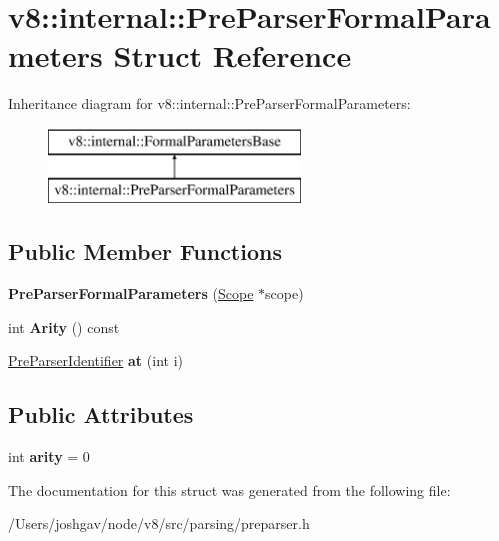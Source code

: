 \hypertarget{structv8_1_1internal_1_1_pre_parser_formal_parameters}{}\section{v8\+:\+:internal\+:\+:Pre\+Parser\+Formal\+Parameters Struct Reference}
\label{structv8_1_1internal_1_1_pre_parser_formal_parameters}
Inheritance diagram for v8\+:\+:internal\+:\+:Pre\+Parser\+Formal\+Parameters\+:\begin{figure}[H]
\begin{center}
\leavevmode
\includegraphics[height=2.000000cm]{structv8_1_1internal_1_1_pre_parser_formal_parameters}
\end{center}
\end{figure}
\subsection*{Public Member Functions}
\begin{DoxyCompactItemize}
\item 
{\bfseries Pre\+Parser\+Formal\+Parameters} (\hyperlink{classv8_1_1internal_1_1_scope}{Scope} $\ast$scope)\hypertarget{structv8_1_1internal_1_1_pre_parser_formal_parameters_a24654784b05a442af649bd4cef909bf5}{}\label{structv8_1_1internal_1_1_pre_parser_formal_parameters_a24654784b05a442af649bd4cef909bf5}

\item 
int {\bfseries Arity} () const \hypertarget{structv8_1_1internal_1_1_pre_parser_formal_parameters_a41708052ef698cd470049d706892f1eb}{}\label{structv8_1_1internal_1_1_pre_parser_formal_parameters_a41708052ef698cd470049d706892f1eb}

\item 
\hyperlink{classv8_1_1internal_1_1_pre_parser_identifier}{Pre\+Parser\+Identifier} {\bfseries at} (int i)\hypertarget{structv8_1_1internal_1_1_pre_parser_formal_parameters_a7fb194e5912f1ccc0cea285a2d73df74}{}\label{structv8_1_1internal_1_1_pre_parser_formal_parameters_a7fb194e5912f1ccc0cea285a2d73df74}

\end{DoxyCompactItemize}
\subsection*{Public Attributes}
\begin{DoxyCompactItemize}
\item 
int {\bfseries arity} = 0\hypertarget{structv8_1_1internal_1_1_pre_parser_formal_parameters_a32e34102a6a89754e5ea7b3f66191f26}{}\label{structv8_1_1internal_1_1_pre_parser_formal_parameters_a32e34102a6a89754e5ea7b3f66191f26}

\end{DoxyCompactItemize}


The documentation for this struct was generated from the following file\+:\begin{DoxyCompactItemize}
\item 
/\+Users/joshgav/node/v8/src/parsing/preparser.\+h\end{DoxyCompactItemize}
